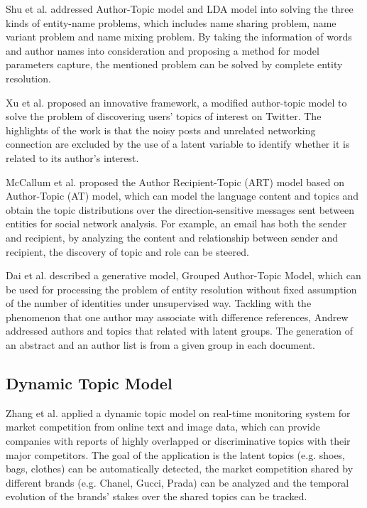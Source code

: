Shu et al. \cite{shu2009latent} addressed Author-Topic model and LDA model into solving the three kinds of entity-name problems, which includes name sharing problem, name variant problem and name mixing problem. By taking the information of words and author names into consideration and proposing a method for model parameters capture, the mentioned problem can be solved by complete entity resolution.

Xu et al. \cite{xu2011discovering} proposed an innovative framework, a modified author-topic model to solve the problem of discovering users’ topics of interest on Twitter. The highlights of the work is that the noisy posts and unrelated networking connection are excluded by the use of a latent variable to identify whether it is related to its author’s interest.

McCallum et al. \cite{mccallum2005topic} proposed the Author Recipient-Topic (ART) model based on Author-Topic (AT) model, which can model the language content and topics and obtain the topic distributions over the direction-sensitive messages sent between entities for social network analysis. For example, an email has both the sender and recipient, by analyzing the content and relationship between sender and recipient, the discovery of topic and role can be steered.

Dai et al. \cite{dai2011grouped} described a generative model, Grouped Author-Topic Model, which can be used for processing the problem of entity resolution without fixed assumption of the number of identities under unsupervised way. Tackling with the phenomenon that one author may associate with difference references, Andrew addressed authors and topics that related with latent groups. The generation of an abstract and an author list is from a given group in each document.

\subsection{Dynamic Topic Model}
\label{subsec:dtmApplication}

Zhang et al. \cite{zhang2015dynamic} applied a dynamic topic model on real-time monitoring system for market competition from online text and image data, which can provide companies with reports of highly overlapped or discriminative topics with their major competitors. The goal of the application is the latent topics (e.g. shoes, bags, clothes) can be automatically detected, the market competition shared by different brands (e.g. Chanel, Gucci, Prada) can be analyzed and the temporal evolution of the brands' stakes over the shared topics can be tracked.

